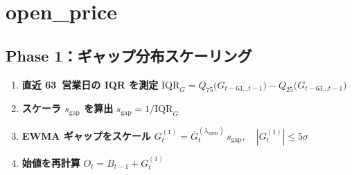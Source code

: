 
\section*{open\_price}\nopagebreak[4]

\subsection*{Phase 1：ギャップ分布スケーリング}\nopagebreak[4]
\begin{flushleft}
\begin{enumerate}
  \item \textbf{直近 63~営業日の IQR を測定}  
        \( \mathrm{IQR}_G
          = Q_{75}\!\bigl(G_{t-63\ldots t-1}\bigr)
          - Q_{25}\!\bigl(G_{t-63\ldots t-1}\bigr) \)

  \item \textbf{スケーラ \(s_{\text{gap}}\) を算出}\;
        \( s_{\text{gap}} = 1 / \mathrm{IQR}_G \)

  \item \textbf{EWMA ギャップをスケール}\;
        \( G_t^{(1)} = \bar G_t^{(\lambda_{\text{open}})}\,
                       s_{\text{gap}},
                       \quad |G_t^{(1)}|\le5\sigma \)

  \item \textbf{始値を再計算}\;
        \( O_t = B_{t-1} + G_t^{(1)} \)
\end{enumerate}
\end{flushleft}

